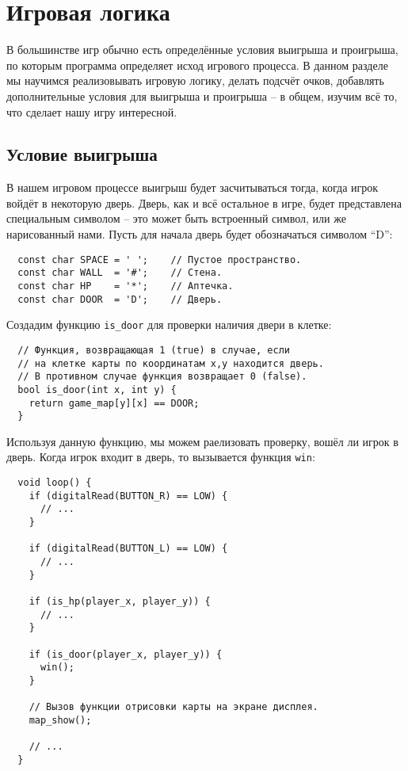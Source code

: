 \documentclass[../sparc.tex]{subfiles}
\begin{document}
\section{Игровая логика}

В большинстве игр обычно есть определённые условия выигрыша и проигрыша, по
которым программа определяет исход игрового процесса.  В данном разделе мы
научимся реализовывать игровую логику, делать подсчёт очков, добавлять
дополнительные условия для выигрыша и проигрыша -- в общем, изучим всё то, что
сделает нашу игру интересной.

\subsection{Условие выигрыша}

В нашем игровом процессе выигрыш будет засчитываться тогда, когда игрок войдёт в
некоторую дверь.  Дверь, как и всё остальное в игре, будет представлена
специальным символом -- это может быть встроенный символ, или же нарисованный
нами.  Пусть для начала дверь будет обозначаться символом ``D'':

\begin{verbatim}
  const char SPACE = ' ';    // Пустое пространство.
  const char WALL  = '#';    // Стена.
  const char HP    = '*';    // Аптечка.
  const char DOOR  = 'D';    // Дверь.
\end{verbatim}

Создадим функцию \texttt{is\_door} для проверки наличия двери в клетке:

\begin{verbatim}
  // Функция, возвращающая 1 (true) в случае, если
  // на клетке карты по координатам x,y находится дверь.
  // В противном случае функция возвращает 0 (false).
  bool is_door(int x, int y) {
    return game_map[y][x] == DOOR;
  }
\end{verbatim}

Используя данную функцию, мы можем раелизовать проверку, вошёл ли игрок в дверь.
Когда игрок входит в дверь, то вызывается функция \texttt{win}:

\begin{verbatim}
  void loop() {
    if (digitalRead(BUTTON_R) == LOW) {
      // ...
    }

    if (digitalRead(BUTTON_L) == LOW) {
      // ...
    }

    if (is_hp(player_x, player_y)) {
      // ...
    }

    if (is_door(player_x, player_y)) {
      win();
    }

    // Вызов функции отрисовки карты на экране дисплея.
    map_show();

    // ...
  }
\end{verbatim}
\end{document}
